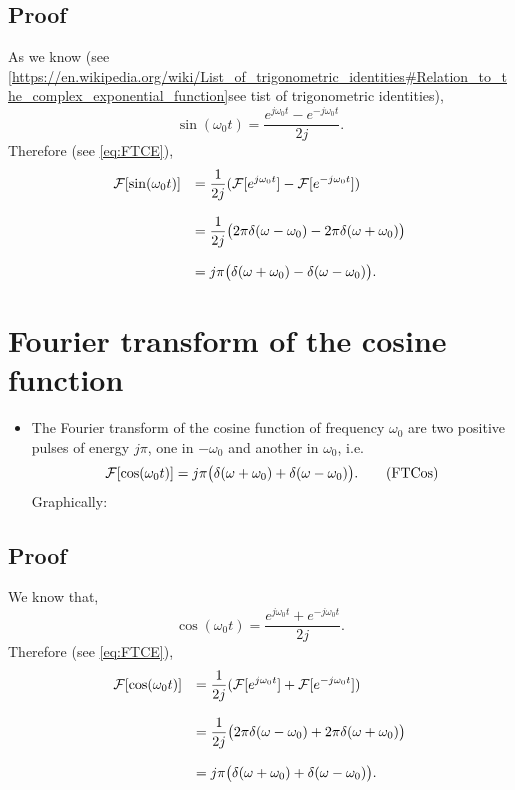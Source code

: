 \subsection*{Proof}
\noindent As we know (see
\ref{https://en.wikipedia.org/wiki/List_of_trigonometric_identities#Relation_to_the_complex_exponential_function}{see
  tist of trigonometric identities}),
\begin{equation*}
  \sin(\omega_0t) = \frac{\displaystyle e^{j\omega_0t}-e^{-j\omega_0t}}{\displaystyle 2j}.
\end{equation*}
Therefore (see \ref{eq:FTCE}),
\begin{equation*}
  \begin{array}{rl}
    {\cal F}[\sin(\omega_0t)] & = \displaystyle\frac{1}{2j}({\cal
      F}[e^{j\omega_0t}]-{\cal F}[e^{-j\omega_0t}])\\\\
    & = \displaystyle\frac{1}{2j}\big(2\pi\delta(\omega-\omega_0)-2\pi\delta(\omega+\omega_0)\big)\\\\
    & = j\pi\big(\delta(\omega+\omega_0)-\delta(\omega-\omega_0)\big).
  \end{array}
\end{equation*}

\section{Fourier transform of the cosine function}
\begin{itemize}
\item The Fourier transform of the cosine function of frequency $\omega_0$
  are two positive pulses of energy $j\pi$, one in $-\omega_0$ and another
  in $\omega_0$, i.e.
  \begin{equation}
    {\cal F}[\cos(\omega_0t)] = j\pi\big(\delta(\omega+\omega_0)+\delta(\omega-\omega_0)\big).
    \tag{FTCos}
    \label{eq:FtCos}
  \end{equation}
  Graphically:
\end{itemize}

\subsection*{Proof}
\noindent We know that,
\begin{equation}
  \cos(\omega_0t) = \frac{\displaystyle e^{j\omega_0t}+e^{-j\omega_0t}}{\displaystyle 2j}.
\end{equation}
Therefore (see \ref{eq:FTCE}),
\begin{equation*}
  \begin{array}{rl}
    {\cal F}[\cos(\omega_0t)] & = \displaystyle\frac{1}{2j}({\cal
      F}[e^{j\omega_0t}]+{\cal F}[e^{-j\omega_0t}])\\\\
    & = \displaystyle\frac{1}{2j}\big(2\pi\delta(\omega-\omega_0)+2\pi\delta(\omega+\omega_0)\big)\\\\
    & = j\pi\big(\delta(\omega+\omega_0)+\delta(\omega-\omega_0)\big).
  \end{array}
\end{equation*}

